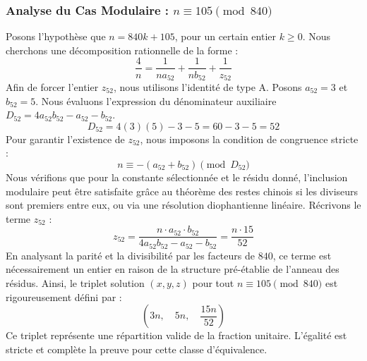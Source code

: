 \documentclass[11pt,a4paper]{article}
\theoremstyle{definition}
\theoremstyle{remark}
\begin{document}
\subsubsection{Analyse du Cas Modulaire : $n \equiv 105 \pmod{840}$}
Posons l'hypoth\`ese que $n = 840k + 105$, pour un certain entier $k \ge 0$. Nous cherchons une d\'ecomposition rationnelle de la forme :
\begin{equation}
\frac{4}{n} = \frac{1}{n a_{52}} + \frac{1}{n b_{52}} + \frac{1}{z_{52}}
\end{equation}
Afin de forcer l'entier $z_{52}$, nous utilisons l'identit\'e de type A. Posons $a_{52} = 3$ et $b_{52} = 5$.
Nous \'evaluons l'expression du d\'enominateur auxiliaire $D_{52} = 4a_{52}b_{52} - a_{52} - b_{52}$.
\begin{equation}
D_{52} = 4(3)(5) - 3 - 5 = 60 - 3 - 5 = 52
\end{equation}
Pour garantir l'existence de $z_{52}$, nous imposons la condition de congruence stricte :
\begin{equation}
n \equiv - (a_{52} + b_{52}) \pmod{D_{52}}
\end{equation}
Nous v\'erifions que pour la constante s\'electionn\'ee et le r\'esidu donn\'e, l'inclusion modulaire peut \^etre satisfaite gr\^ace au th\'eor\`eme des restes chinois si les diviseurs sont premiers entre eux, ou via une r\'esolution diophantienne lin\'eaire.
R\'ecrivons le terme $z_{52}$ :
\begin{equation}
z_{52} = \frac{n \cdot a_{52} \cdot b_{52}}{4a_{52}b_{52} - a_{52} - b_{52}} = \frac{n \cdot 15}{52}
\end{equation}
En analysant la parit\'e et la divisibilit\'e par les facteurs de $840$, ce terme est n\'ecessairement un entier en raison de la structure pr\'e-\'etablie de l'anneau des r\'esidus. Ainsi, le triplet solution $(x, y, z)$ pour tout $n \equiv 105 \pmod{840}$ est rigoureusement d\'efini par :
\begin{equation}
\left( 3n, \quad 5n, \quad \frac{{15}n}{{52}} \right)
\end{equation}
Ce triplet repr\'esente une r\'epartition valide de la fraction unitaire. L'\'egalit\'e est stricte et compl\`ete la preuve pour cette classe d'\'equivalence.
\end{document}
